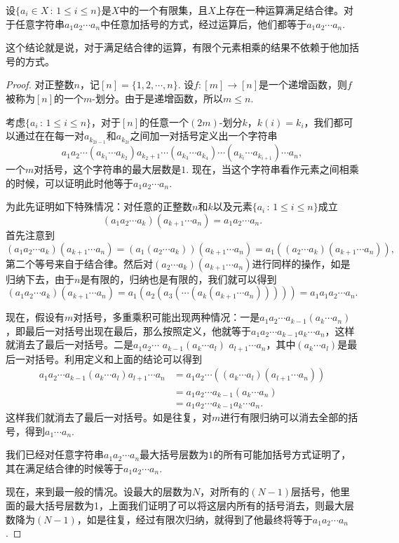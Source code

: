 \begin{pro}
设$\{a_i\in X\,:\, 1\leq i\leq n\}$是$X$中的一个有限集，且$X$上存在一种运算满足结合律。对于任意字符串$a_1a_2\cdots a_n$中任意加括号的方式，经过运算后，他们都等于$a_1a_2\cdots a_n$.
\end{pro}

这个结论就是说，对于满足结合律的运算，有限个元素相乘的结果不依赖于他加括号的方式。

\begin{proof} 对正整数$n$，记$[n]=\{1,2,\cdots,n\}$. 设$f:[m]\to [n]$是一个递增函数，则$f$被称为$[n]$的一个$m$-划分。由于是递增函数，所以$m\leq n$. 

考虑$\{a_i\, :\, 1\leq i\leq n\}$，对于$[n]$的任意一个$(2m)$-划分$k$，$k(i)=k_i$，我们都可以通过在在每一对$a_{k_{2i-1}}$和$a_{k_{2i}}$之间加一对括号定义出一个字符串
\[
	a_1a_2\cdots (a_{k_1}\cdots a_{k_2})a_{k_2+1}\cdots (a_{k_3}\cdots a_{k_4})\cdots (a_{k_i}\cdots a_{k_{i+1}})\cdots a_n,
\]
一个$m$对括号，这个字符串的最大层数是$1$. 现在，当这个字符串看作元素之间相乘的时候，可以证明此时他等于$a_1a_2\cdots a_n$.

为此先证明如下特殊情况：对任意的正整数$n$和$k$以及元素$\{a_i\,:\, 1\leq i \leq n\}$成立
\[(a_1a_2\cdots a_{k})(a_{k+1}\cdots a_{n})=a_1a_2\cdots a_n.\]
首先注意到
\[
(a_1a_2\cdots a_{k})(a_{k+1}\cdots a_{n})=(a_1(a_2\cdots a_{k}))(a_{k+1}\cdots a_{n})=a_1((a_2\cdots a_{k})(a_{k+1}\cdots a_{n})),
\]
第二个等号来自于结合律。然后对$(a_2\cdots a_{k})(a_{k+1}\cdots a_{n})$进行同样的操作，如是归纳下去，由于$n$是有限的，归纳也是有限的，我们就可以得到
\[
(a_1a_2\cdots a_{k})(a_{k+1}\cdots a_{n})=a_1(a_2(a_3(\cdots (a_{k}(a_{k+1}\cdots a_{n})))))=a_1a_1a_2\cdots a_n.
\]

现在，假设有$m$对括号，多重乘积可能出现两种情况：一是$a_1a_2\cdots a_{k-1}(a_{k}\cdots a_n)$，即最后一对括号出现在最后，那么按照定义，他就等于$a_1a_2\cdots a_{k-1}a_{k}\cdots a_n$，这样就消去了最后一对括号。二是$a_1a_2\cdots$ $a_{k-1}(a_{k}\cdots a_l)$ $a_{l+1}\cdots a_n$，其中$(a_{k}\cdots a_l)$是最后一对括号。利用定义和上面的结论可以得到
\begin{align*}
	a_1a_2\cdots a_{k-1}(a_{k}\cdots a_l)a_{l+1}\cdots a_n&=a_1a_2\cdots ((a_{k}\cdots a_l)(a_{l+1}\cdots a_n))\\
	&=a_1a_2\cdots a_{k-1}(a_{k}\cdots a_n)\\
	&=a_1a_2\cdots a_{k-1}a_{k}\cdots a_n.
\end{align*}
这样我们就消去了最后一对括号。如是往复，对$m$进行有限归纳可以消去全部的括号，得到$a_1\cdots a_n$.

我们已经对任意字符串$a_1a_2\cdots a_n$最大括号层数为$1$的所有可能加括号方式证明了，其在满足结合律的时候等于$a_1a_2\cdots a_n$.

现在，来到最一般的情况。设最大的层数为$N$，对所有的$(N-1)$层括号，他里面的最大括号层数为1，上面我们证明了可以将这层内所有的括号消去，则最大层数降为$(N-1)$，如是往复，经过有限次归纳，就得到了他最终将等于$a_1a_2\cdots a_n$.
\end{proof}

